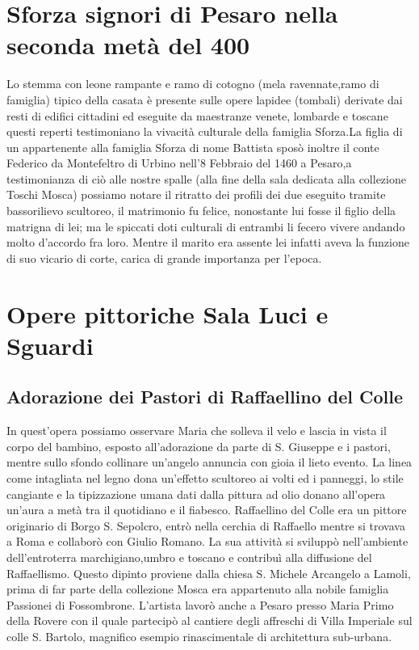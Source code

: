 \documentclass[12pt,a4paper]{article}
\begin{document}
	\section{Sforza signori di Pesaro nella seconda metà del 400}
	Lo stemma con leone rampante e ramo di cotogno (mela ravennate,ramo di famiglia) tipico della casata è presente sulle opere lapidee (tombali) derivate dai resti di edifici cittadini ed eseguite da maestranze venete, lombarde e toscane questi reperti testimoniano la vivacità culturale della famiglia Sforza.La figlia di un appartenente alla famiglia Sforza di nome Battista sposò inoltre il conte Federico da Montefeltro di Urbino nell'8 Febbraio del 1460 a Pesaro,a testimonianza di ciò alle nostre spalle (alla fine della sala dedicata alla collezione Toschi Mosca) possiamo notare il ritratto dei profili dei due eseguito tramite bassorilievo scultoreo, il matrimonio fu felice, nonostante lui fosse il figlio della matrigna di lei; ma le spiccati doti culturali di entrambi li fecero vivere andando molto d'accordo fra loro. Mentre il marito era assente lei infatti aveva la funzione di suo vicario di corte, carica di grande importanza per l'epoca.
	\section{Opere pittoriche Sala Luci e Sguardi} 
	\subsection{Adorazione dei Pastori di Raffaellino del Colle}
	In quest'opera possiamo osservare Maria che solleva il velo e lascia in vista il corpo del bambino, esposto all'adorazione da parte di S. Giuseppe e i pastori, mentre sullo sfondo collinare un'angelo annuncia con gioia il lieto evento.
	La linea come intagliata nel legno dona un'effetto scultoreo ai volti ed i panneggi, lo stile cangiante e la tipizzazione umana dati dalla pittura ad olio donano all'opera un'aura a metà tra il quotidiano e il fiabesco.
	Raffaellino del Colle era un pittore originario di Borgo S. Sepolcro, entrò nella cerchia di Raffaello mentre si trovava a Roma e collaborò con Giulio Romano. La sua attività si sviluppò nell'ambiente dell'entroterra marchigiano,umbro e toscano e contribuì alla diffusione del Raffaellismo. Questo dipinto proviene dalla chiesa S. Michele Arcangelo a Lamoli, prima di far parte della collezione Mosca era appartenuto alla nobile famiglia Passionei di Fossombrone.
	L'artista lavorò anche a Pesaro presso Maria Primo della Rovere con il quale partecipò al cantiere degli affreschi di Villa Imperiale sul colle S. Bartolo, magnifico esempio rinascimentale di architettura sub-urbana.
\end{document}
